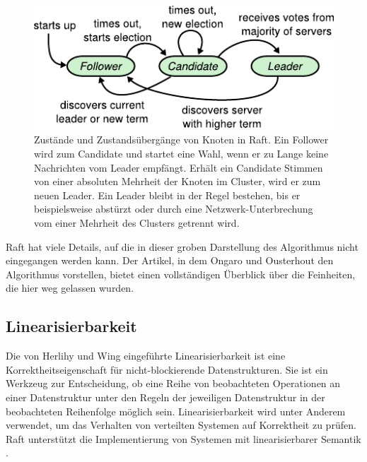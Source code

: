 \documentclass[12pt,a4paper]{report}
\begin{document}
\begin{figure}[H]
	\centering
	\includegraphics[width=.8\linewidth]{img/raft_state_machine.pdf}
    \caption{
        Zustände und Zustandsübergänge von Knoten in Raft. Ein Follower wird zum Candidate und startet eine Wahl, wenn er zu Lange
        keine Nachrichten vom Leader empfängt. Erhält ein Candidate Stimmen von einer absoluten Mehrheit der Knoten im Cluster,
        wird er zum neuen Leader. Ein Leader bleibt in der Regel bestehen, bis er beispielsweise abstürzt oder durch eine
        Netzwerk-Unterbrechung vom einer Mehrheit des Clusters getrennt wird. \cite{raft_original_paper}
    }
	\label{fig:raft_states}
\end{figure}

Raft hat viele Details, auf die in dieser groben Darstellung des Algorithmus nicht eingegangen werden kann. Der Artikel, in dem
Ongaro und Ousterhout \cite{raft_original_paper} den Algorithmus vorstellen, bietet einen vollständigen Überblick über die
Feinheiten, die hier weg gelassen wurden.

\subsection{Linearisierbarkeit}
Die von Herlihy und Wing \cite{linearizability_paper} eingeführte Linearisierbarkeit ist eine Korrektheitseigenschaft für
nicht-blockierende Datenstrukturen. Sie ist ein Werkzeug zur Entscheidung, ob eine Reihe von beobachteten Operationen an einer
Datenstruktur unter den Regeln der jeweiligen Datenstruktur in der beobachteten Reihenfolge möglich sein. Linearisierbarkeit wird
unter Anderem verwendet, um das Verhalten von verteilten Systemen auf Korrektheit zu prüfen. Raft unterstützt die Implementierung
von Systemen mit linearisierbarer Semantik \cite{raft_original_paper}.
\end{document}
